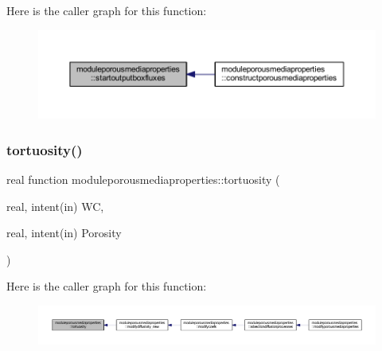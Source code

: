 Here is the caller graph for this function\+:\nopagebreak
\begin{figure}[H]
\begin{center}
\leavevmode
\includegraphics[width=350pt]{namespacemoduleporousmediaproperties_a0c7ca57252cdb274ae0ce23c3deeba74_icgraph}
\end{center}
\end{figure}
\mbox{\label{namespacemoduleporousmediaproperties_ad5b352d84190c0b9d6cebc1a83db8ded}} 
\subsubsection{\texorpdfstring{tortuosity()}{tortuosity()}}
{\footnotesize\ttfamily real function moduleporousmediaproperties\+::tortuosity (\begin{DoxyParamCaption}\item[{real, intent(in)}]{WC,  }\item[{real, intent(in)}]{Porosity }\end{DoxyParamCaption})\hspace{0.3cm}{\ttfamily [private]}}

Here is the caller graph for this function\+:\nopagebreak
\begin{figure}[H]
\begin{center}
\leavevmode
\includegraphics[width=350pt]{namespacemoduleporousmediaproperties_ad5b352d84190c0b9d6cebc1a83db8ded_icgraph}
\end{center}
\end{figure}
\mbox{\label{namespacemoduleporousmediaproperties_a08471307dc61da0cc694bc4e7b47b840}} 
